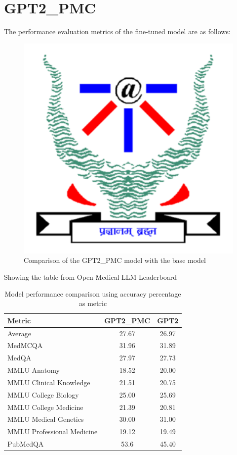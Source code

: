 \section{GPT2\_PMC}
The performance evaluation metrics of the fine-tuned model are as follows:
\begin{figure}[H]
    \centering
\includegraphics[width=1.0\textwidth]{IMAGE/IIITAlogo.png}
\caption{Comparison of the GPT2\_PMC model with the base model}
\end{figure}
Showing the table from Open Medical-LLM Leaderboard \cite{openllmleaderboard}
\renewcommand{\arraystretch}{1.5}
\begin{table}[H]
    \begin{center}
    \begin{tabular}{|l|c|c|}
    \hline
    \textbf{Metric} & \textbf{GPT2\_PMC} & \textbf{GPT2} \\
    \hline
    Average & 27.67 & 26.97 \\
    \hline
    MedMCQA & 31.96 & 31.89 \\
    \hline
    MedQA & 27.97 & 27.73 \\
    \hline
    MMLU Anatomy & 18.52 & 20.00 \\
    \hline
    MMLU Clinical Knowledge & 21.51 & 20.75 \\
    \hline
    MMLU College Biology & 25.00 & 25.69 \\
    \hline
    MMLU College Medicine & 21.39 & 20.81 \\
    \hline
    MMLU Medical Genetics & 30.00 & 31.00 \\
    \hline
    MMLU Professional Medicine & 19.12 & 19.49 \\
    \hline
    PubMedQA & 53.6 & 45.40 \\
    \hline
    \end{tabular}
    \end{center}
\caption{Model performance comparison using accuracy percentage as metric} 
\end{table}


